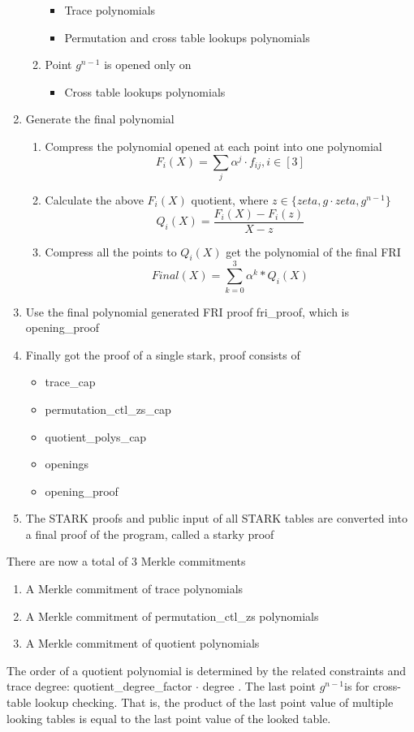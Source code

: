 \begin{enumerate}
\begin{enumerate}
            \begin{itemize}
                \item Trace polynomials
                \item Permutation and cross table lookups polynomials
            \end{itemize}
        \item Point $ g^{n-1} $ is opened only on
            \begin{itemize}
                \item Cross table lookups polynomials
            \end{itemize}
        \end{enumerate}
    \item Generate the final polynomial
        \begin{enumerate}
            \item Compress the polynomial opened at each point into one polynomial $$ F_i(X) = \sum_{j} \alpha^j \cdot f_{ij}, i \in [3] $$
            \item Calculate the above $ F_i(X) $ quotient, where $ z \in \{ zeta, g \cdot zeta, g^{n-1} \} $ $$ Q_i(X) = \frac{F_i(X) - F_i(z)}{X - z} $$
            \item Compress all the points to $ Q_i(X) $ get the polynomial of the final FRI $$ Final(X) = \sum_{k=0}^3 \alpha^k * Q_i(X) $$
        \end{enumerate}
    \item Use the final polynomial generated FRI proof fri\_proof, which is opening\_proof
    \item Finally got the proof of a single stark, proof consists of
        \begin{itemize}
            \item trace\_cap
            \item permutation\_ctl\_zs\_cap
            \item quotient\_polys\_cap
            \item openings
            \item opening\_proof
        \end{itemize}
    \item The STARK proofs and public input of all STARK tables are converted into a final proof of the program, called a starky proof
\end{enumerate}

\noindent There are now a total of 3 Merkle commitments

\begin{enumerate}
    \item A Merkle commitment of trace polynomials
    \item A Merkle commitment of permutation\_ctl\_zs polynomials
    \item A Merkle commitment of quotient polynomials
\end{enumerate}

The order of a quotient polynomial is determined by the related constraints and trace degree: quotient\_degree\_factor $ \cdot $ degree . The last point $ g^{n-1} $is for cross-table lookup checking. That is, the product of the last point value of multiple looking tables is equal to the last point value of the looked table.
